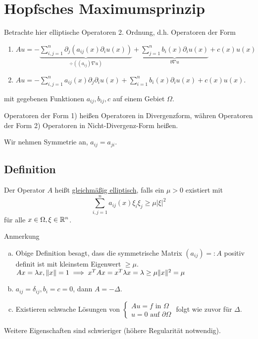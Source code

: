 \section{Hopfsches Maximumsprinzip}

Betrachte hier elliptische Operatoren 2. Ordnung, d.h. Operatoren der Form

\begin{enumerate}[1)]
  \item $Au = - \underbrace{\sum_{i,j = 1}^n \partial_j\left(a_{ij}(x) \partial_i u(x)\right)}_{\div((a_{ij})\nabla u)} + \underbrace{\sum_{j = 1}^n b_i(x) \partial_i u(x)}_{b \nabla u} + c(x) u(x)$
  \item $Au = - \sum_{i,j = 1}^n a_{ij}(x) \partial_j \partial_i u(x) + \sum_{i = 1}^n b_i(x) \partial_i u(x) + c(x) u(x)$.
\end{enumerate}
mit gegebenen Funktionen $a_{ij}, b_{ij}, c$ auf einem Gebiet $\Omega$.

Operatoren der Form 1) heißen Operatoren in  Divergenzform, währen Operatoren der Form 2) Operatoren in Nicht-Divergenz-Form heißen.

Wir nehmen Symmetrie an, $a_{ij} = a_{ji}$.

\subsection{Definition}

Der Operator $A$ heißt \underline{gleichmäßig elliptisch}, falls ein $\mu > 0 $ existiert mit
$$
\sum_{i,j = 1}^n a_{ij}(x) \xi_i \xi_j \geq \mu |\xi|^2
$$
für alle $x \in \Omega, \xi \in \mathbb{R}^n$.

Anmerkung
\begin{enumerate}[a)]
  \item Obige Definition besagt, dass die symmetrische Matrix $(a_{ij}) =: A$ positiv definit ist mit kleinstem Eigenwert $\geq \mu$.
    {\tiny{ $Ax = \lambda x, \lVert x \rVert = 1 \implies x^T A x = x^T \lambda x = \lambda \geq \mu \lVert x \rVert^2 = \mu $}}
  \item $a_{ij} = \delta_{ij}, b_i = c = 0$, dann $A = -\Delta$.
  \item Existieren schwache Lösungen von $\begin{cases} Au = f \text{ in } \Omega \\ u = 0 \text{ auf } \partial \Omega\end{cases}$ folgt wie zuvor für $\Delta$.
\end{enumerate}

Weitere Eigenschaften sind schwieriger (höhere Regularität notwendig).

